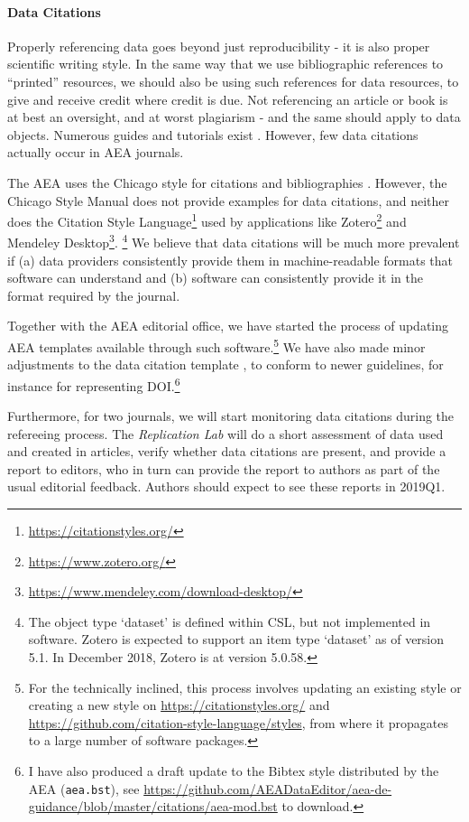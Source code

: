 \documentclass[AEJ]{AEA}
\newcommand{\urlcite}[2]{#2\footnote{\url{#1}}}
\begin{document}
\paragraph{Data Citations}
Properly referencing data goes beyond just reproducibility - it is also proper scientific writing style. In the same way that we use bibliographic references to ``printed'' resources, we should also be using such references for data resources, to give and receive credit where credit is due. Not referencing an article or book is at best an oversight, and at worst plagiarism - and the same should apply to data objects. Numerous guides and tutorials exist  \citep{dataone-l09,icpsr-data-cite,force11declaration}. However, few data citations actually occur in AEA journals.

The AEA uses the Chicago style for citations and bibliographies \citep{aeadatarefs}. However, the Chicago Style Manual \citep{citation-machine,ChicagoManualofStyleChicagoManualStyle2018} does not provide examples for data citations, and neither does the \urlcite{https://citationstyles.org/}{Citation Style Language} used by applications like \urlcite{https://www.zotero.org/}{Zotero} and \urlcite{https://www.mendeley.com/download-desktop/}{Mendeley Desktop}.%
\footnote{The object type `dataset' is defined within CSL, but not implemented in software. Zotero is expected to support an item type `dataset' as of version 5.1. In December 2018, Zotero is at version 5.0.58.}
We believe that data citations will be much more prevalent if (a) data providers consistently provide them in machine-readable formats that software can understand and (b) software can consistently provide it in the format required by the journal.

Together with the  AEA editorial office, we have   started the process of updating AEA templates available through such software.\footnote{For the technically inclined, this process involves updating an existing style or creating a new style on \url{https://citationstyles.org/} and \url{https://github.com/citation-style-language/styles}, from where it propagates to a large number of software packages.} We have also made minor adjustments to the data citation template \citep{aeadatarefs}, to conform to newer guidelines, for instance for representing \ac{DOI}.\footnote{I have also produced a draft update to the Bibtex style distributed by the AEA (\texttt{aea.bst}), see  \url{https://github.com/AEADataEditor/aea-de-guidance/blob/master/citations/aea-mod.bst} to download.}

Furthermore, for two journals, we will start monitoring data citations during the refereeing process. The \textit{Replication Lab} will do a short assessment of data used and created in articles, verify whether data citations are present, and provide a report to editors, who in turn can provide the report to authors as part of the usual editorial feedback. Authors should expect to see these reports in 2019Q1.
\end{document}
